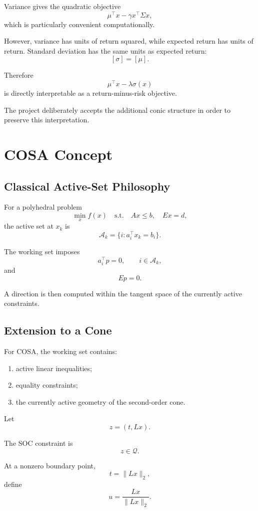 \documentclass[11pt,a4paper]{article}
\begin{document}
Variance gives the quadratic objective
\[
\mu^\top x-\gamma x^\top\Sigma x,
\]
which is particularly convenient computationally.

However, variance has units of return squared, while expected return
has units of return. Standard deviation has the same units as
expected return:
\[
[\sigma]=[\mu].
\]

Therefore
\[
\mu^\top x-\lambda\sigma(x)
\]
is directly interpretable as a return-minus-risk objective.

The project deliberately accepts the additional conic structure in
order to preserve this interpretation.

\section{COSA Concept}

\subsection{Classical Active-Set Philosophy}

For a polyhedral problem
\[
\min_x f(x)
\quad\text{s.t.}\quad
Ax\leq b,\quad Ex=d,
\]
the active set at $x_k$ is
\[
\mathcal A_k
=
\{i:a_i^\top x_k=b_i\}.
\]

The working set imposes
\[
a_i^\top p=0,
\qquad i\in\mathcal A_k,
\]
and
\[
Ep=0.
\]

A direction is then computed within the tangent space of the
currently active constraints.

\subsection{Extension to a Cone}

For COSA, the working set contains:

\begin{enumerate}
    \item active linear inequalities;
    \item equality constraints;
    \item the currently active geometry of the second-order cone.
\end{enumerate}

Let
\[
z=(t,Lx).
\]

The SOC constraint is
\[
z\in\mathcal Q.
\]

At a nonzero boundary point,
\[
t=\|Lx\|_2,
\]
define
\[
u=\frac{Lx}{\|Lx\|_2}.
\]
\end{document}
